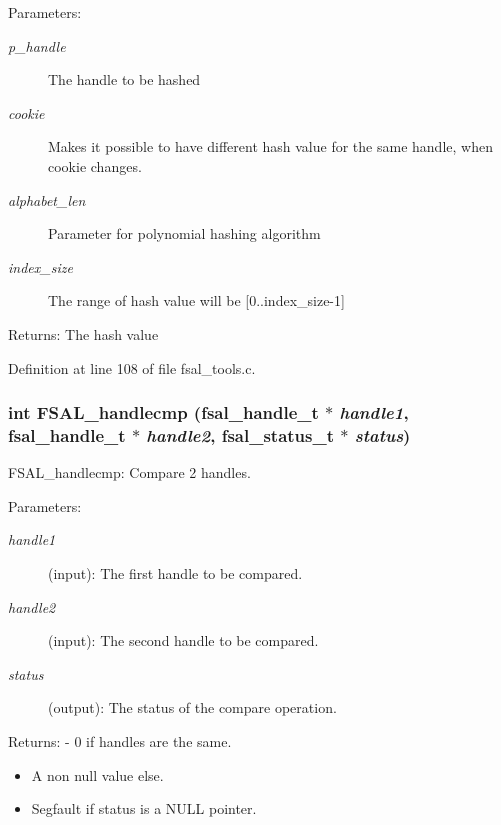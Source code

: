 \begin{Desc}
\item[Parameters:]
\begin{description}
\item[{\em p\_\-handle}]The handle to be hashed \item[{\em cookie}]Makes it possible to have different hash value for the same handle, when cookie changes. \item[{\em alphabet\_\-len}]Parameter for polynomial hashing algorithm \item[{\em index\_\-size}]The range of hash value will be [0..index\_\-size-1]\end{description}
\end{Desc}
\begin{Desc}
\item[Returns:]The hash value \end{Desc}


Definition at line 108 of file fsal\_\-tools.c.
\subsubsection{\setlength{\rightskip}{0pt plus 5cm}int FSAL\_\-handlecmp (fsal\_\-handle\_\-t $\ast$ {\em handle1}, fsal\_\-handle\_\-t $\ast$ {\em handle2}, fsal\_\-status\_\-t $\ast$ {\em status})}\label{fsal__tools_8c_a5}


FSAL\_\-handlecmp: Compare 2 handles.

\begin{Desc}
\item[Parameters:]
\begin{description}
\item[{\em handle1}](input): The first handle to be compared. \item[{\em handle2}](input): The second handle to be compared. \item[{\em status}](output): The status of the compare operation.\end{description}
\end{Desc}
\begin{Desc}
\item[Returns:]- 0 if handles are the same.\begin{itemize}
\item A non null value else.\item Segfault if status is a NULL pointer. \end{itemize}
\end{Desc}


